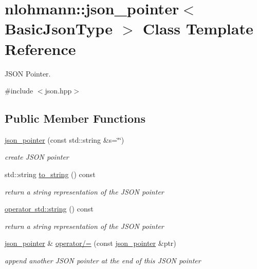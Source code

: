 \hypertarget{classnlohmann_1_1json__pointer}{}\section{nlohmann\+::json\+\_\+pointer$<$ Basic\+Json\+Type $>$ Class Template Reference}
\label{classnlohmann_1_1json__pointer}


J\+S\+ON Pointer.  




{\ttfamily \#include $<$json.\+hpp$>$}

\subsection*{Public Member Functions}
\begin{DoxyCompactItemize}
\item 
\mbox{\hyperlink{classnlohmann_1_1json__pointer_a7f32d7c62841f0c4a6784cf741a6e4f8}{json\+\_\+pointer}} (const std\+::string \&s=\char`\"{}\char`\"{})
\begin{DoxyCompactList}\small\item\em create J\+S\+ON pointer \end{DoxyCompactList}\item 
std\+::string \mbox{\hyperlink{classnlohmann_1_1json__pointer_a3d4b15d32d096e3776c5d2c773b524f5}{to\+\_\+string}} () const
\begin{DoxyCompactList}\small\item\em return a string representation of the J\+S\+ON pointer \end{DoxyCompactList}\item 
\mbox{\hyperlink{classnlohmann_1_1json__pointer_ae9015c658f99cf3d48a8563accc79988}{operator std\+::string}} () const
\begin{DoxyCompactList}\small\item\em return a string representation of the J\+S\+ON pointer \end{DoxyCompactList}\item 
\mbox{\hyperlink{classnlohmann_1_1json__pointer}{json\+\_\+pointer}} \& \mbox{\hyperlink{classnlohmann_1_1json__pointer_a7395bd0af29ac23fd3f21543c935cdfa}{operator/=}} (const \mbox{\hyperlink{classnlohmann_1_1json__pointer}{json\+\_\+pointer}} \&ptr)
\begin{DoxyCompactList}\small\item\em append another J\+S\+ON pointer at the end of this J\+S\+ON pointer \end{DoxyCompactList}\item 

\end{DoxyCompactItemize}
